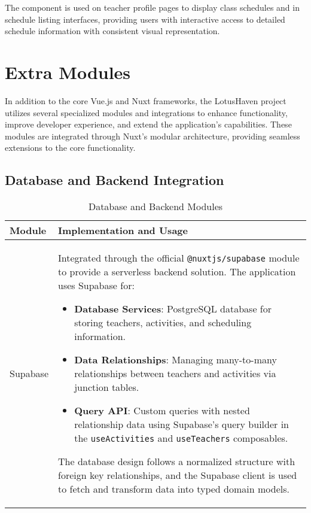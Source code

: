 The component is used on teacher profile pages to display class schedules and in schedule listing interfaces, providing users with interactive access to detailed schedule information with consistent visual representation.
\section{Extra Modules}

In addition to the core Vue.js and Nuxt frameworks, the LotusHaven project utilizes several specialized modules and integrations to enhance functionality, improve developer experience, and extend the application's capabilities. These modules are integrated through Nuxt's modular architecture, providing seamless extensions to the core functionality.

\subsection{Database and Backend Integration}

\begin{table}[H]
    \centering
    \setlength{\tabcolsep}{5pt}
    \renewcommand{\arraystretch}{1.2} 
    \begin{tabular}{|p{3.5cm}|p{10.8cm}|}
        \hline
        \rowcolor{bluepoli!20}
        \textbf{Module} & \textbf{Implementation and Usage} \\
        \hline
        Supabase & 
        Integrated through the official \texttt{@nuxtjs/supabase} module to provide a serverless backend solution. The application uses Supabase for:
        \begin{itemize}
            \item \textbf{Database Services}: PostgreSQL database for storing teachers, activities, and scheduling information.
            \item \textbf{Data Relationships}: Managing many-to-many relationships between teachers and activities via junction tables.
            \item \textbf{Query API}: Custom queries with nested relationship data using Supabase's query builder in the \texttt{useActivities} and \texttt{useTeachers} composables.
        \end{itemize}
        The database design follows a normalized structure with foreign key relationships, and the Supabase client is used to fetch and transform data into typed domain models.
        \\
        \hline
    \end{tabular}
    \caption{Database and Backend Modules}
\end{table}

